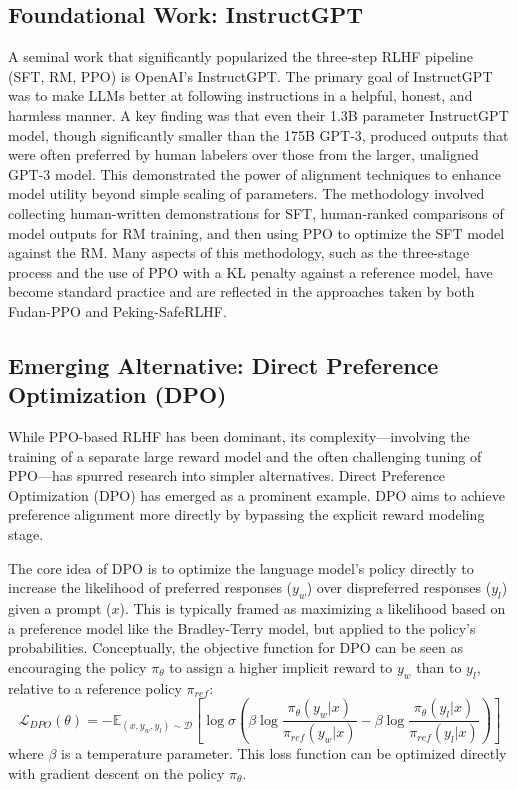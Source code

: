 \documentclass{article} %
\begin{document}
\subsection{Foundational Work: InstructGPT}
A seminal work that significantly popularized the three-step RLHF pipeline (SFT, RM, PPO) is OpenAI's InstructGPT. \cite{Ouyang2022InstructGPT} The primary goal of InstructGPT was to make LLMs better at following instructions in a helpful, honest, and harmless manner. A key finding was that even their 1.3B parameter InstructGPT model, though significantly smaller than the 175B GPT-3, produced outputs that were often preferred by human labelers over those from the larger, unaligned GPT-3 model. \cite{Ouyang2022InstructGPT} This demonstrated the power of alignment techniques to enhance model utility beyond simple scaling of parameters. The methodology involved collecting human-written demonstrations for SFT, human-ranked comparisons of model outputs for RM training, and then using PPO to optimize the SFT model against the RM. \cite{Ouyang2022InstructGPT} Many aspects of this methodology, such as the three-stage process and the use of PPO with a KL penalty against a reference model, have become standard practice and are reflected in the approaches taken by both Fudan-PPO and Peking-SafeRLHF.

\subsection{Emerging Alternative: Direct Preference Optimization (DPO)}
While PPO-based RLHF has been dominant, its complexity—involving the training of a separate large reward model and the often challenging tuning of PPO—has spurred research into simpler alternatives. Direct Preference Optimization (DPO) has emerged as a prominent example. \cite{Rafailov2023DPO, Amini2024DPOOffset} DPO aims to achieve preference alignment more directly by bypassing the explicit reward modeling stage.

The core idea of DPO is to optimize the language model's policy directly to increase the likelihood of preferred responses ($y_w$) over dispreferred responses ($y_l$) given a prompt ($x$). This is typically framed as maximizing a likelihood based on a preference model like the Bradley-Terry model, but applied to the policy's probabilities. Conceptually, the objective function for DPO can be seen as encouraging the policy $\pi_\theta$ to assign a higher implicit reward to $y_w$ than to $y_l$, relative to a reference policy $\pi_{ref}$:
$$ \mathcal{L}_{DPO}(\theta) = -\mathbb{E}_{(x, y_w, y_l) \sim \mathcal{D}} \left[\log \sigma\left(\beta \log \frac{\pi_\theta(y_w|x)}{\pi_{ref}(y_w|x)} - \beta \log \frac{\pi_\theta(y_l|x)}{\pi_{ref}(y_l|x)}\right)\right] $$
where $\beta$ is a temperature parameter. This loss function can be optimized directly with gradient descent on the policy $\pi_\theta$.
\end{document}

